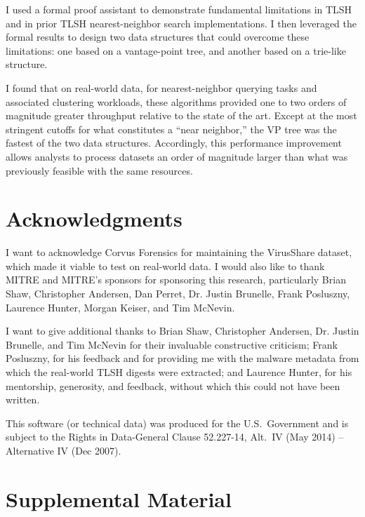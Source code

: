 \documentclass[5p,final]{elsarticle}
\begin{document}
I used a formal proof assistant to demonstrate fundamental
limitations in TLSH and in prior TLSH nearest-neighbor search
implementations. I then leveraged the formal results to design two
data structures that could overcome these limitations: one based on
a vantage-point tree, and another based on a trie-like structure.

I found that on real-world data, for nearest-neighbor querying tasks
and associated clustering workloads, these algorithms provided one to
two orders of magnitude greater throughput relative to the state of
the art. Except at the most stringent cutoffs for what constitutes a
``near neighbor,'' the VP tree was the fastest of the two data
structures. Accordingly, this performance improvement allows
analysts to process datasets an order of magnitude larger than what
was previously feasible with the same resources.

\section{Acknowledgments}

I want to acknowledge Corvus Forensics for maintaining the VirusShare
dataset, which made it viable to test on real-world data. I would
also like to thank MITRE and MITRE's sponsors for sponsoring this
research, particularly Brian Shaw, Christopher Andersen,
Dan Perret, Dr. Justin Brunelle, Frank Posluszny, Laurence Hunter,
Morgan Keiser, and Tim McNevin.

I want to give additional thanks to Brian Shaw,
Christopher Andersen, Dr. Justin Brunelle, and Tim McNevin for their
invaluable constructive criticism; Frank Posluszny, for his feedback and
for providing me with the malware metadata from which the real-world
TLSH digests were extracted; and Laurence Hunter, for his mentorship,
generosity, and feedback, without which this could not have been written.

This software (or technical data) was produced for the
U.S.~Government and is subject to the Rights in Data-General Clause
52.227-14, Alt.~IV (May 2014) -- Alternative IV (Dec 2007).




\clearpage

\appendix

\section{Supplemental Material}\label{supplementals}
\end{document}
